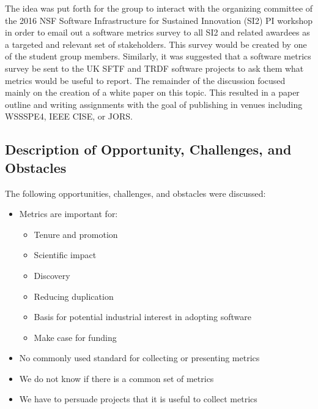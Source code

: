 \smallskip
\noindent
The idea was put forth for the group to interact with the organizing committee
of the 2016 NSF Software Infrastructure for Sustained Innovation (SI2) PI
workshop in order to email out a software metrics survey to all SI2 and related
awardees as a targeted and relevant set of stakeholders. This survey would be
created by one of the student group members. Similarly, it was suggested that a
software metrics survey be sent to the UK SFTF and TRDF software projects to ask
them what metrics would be useful to report. The remainder of the discussion
focused mainly on the creation of a white paper on this topic. This resulted in
a paper outline and writing assignments with the goal of publishing in venues
including WSSSPE4, IEEE CISE, or JORS.



\subsection{Description of Opportunity, Challenges, and Obstacles}

The following opportunities, challenges, and obstacles were discussed:
%
\begin{itemize}
\item
Metrics are important for:

\begin{itemize}
\item
        Tenure and promotion

\item
        Scientific impact

\item
        Discovery

\item
        Reducing duplication

\item
        Basis for potential industrial interest in adopting software

\item
        Make case for funding
\end{itemize}

\item
No commonly used standard for collecting or presenting metrics

\item
We do not know if there is a common set of metrics

\item
We have to persuade projects that it is useful to collect metrics

\end{itemize}



